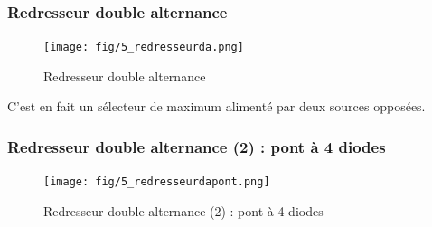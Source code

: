 \documentclass[a4paper]{article}
\begin{document}
    \subsubsection{Redresseur double alternance}
    \begin{figure}[H]
        \begin{center}
            \texttt{[image: fig/5\_redresseurda.png]}
            \caption{Redresseur double alternance}
            \label{fig:5_redresseurda}
        \end{center}
    \end{figure}
    C'est en fait un sélecteur de maximum alimenté par deux sources opposées.

    \subsubsection{Redresseur double alternance (2) : pont à 4 diodes}
    \begin{figure}[H]
        \begin{center}
            \texttt{[image: fig/5\_redresseurdapont.png]}
            \caption{Redresseur double alternance (2) : pont à 4 diodes}
            \label{fig:5_redresseurdapont}
        \end{center}
    \end{figure}
\end{document}

